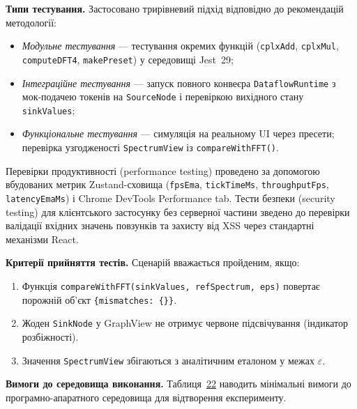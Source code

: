 \textbf{Типи тестування.} Застосовано трирівневий підхід відповідно до
рекомендацій методології:

\begin{itemize}
\item
  \emph{Модульне тестування} --- тестування окремих функцій
  (\texttt{cplxAdd}, \texttt{cplxMul}, \texttt{computeDFT4},
  \texttt{makePreset}) у середовищі Jest~29;
\item
  \emph{Інтеграційне тестування} --- запуск повного конвеєра
  \texttt{DataflowRuntime} з мок-подачею токенів на \texttt{SourceNode}
  і перевіркою вихідного стану \texttt{sinkValues};
\item
  \emph{Функціональне тестування} --- симуляція на реальному UI через
  пресети; перевірка узгодженості \texttt{SpectrumView} із
  \texttt{compareWithFFT()}.
\end{itemize}

Перевірки продуктивності (performance testing) проведено за допомогою
вбудованих метрик Zustand-сховища (\texttt{fpsEma}, \texttt{tickTimeMs},
\texttt{throughputFps}, \texttt{latencyEmaMs}) і Chrome DevTools
Performance tab. Тести безпеки (security testing) для клієнтського
застосунку без серверної частини зведено до перевірки валідації вхідних
значень повзунків та захисту від XSS через стандартні механізми React.

\textbf{Критерії прийняття тестів.} Сценарій вважається пройденим, якщо:

\begin{enumerate}
\def\labelenumi{\arabic{enumi}.}
\item
  Функція \texttt{compareWithFFT(sinkValues,\ refSpectrum,\ eps)}
  повертає порожній об'єкт \texttt{\{mismatches:\ \{\}\}}.
\item
  Жоден \texttt{SinkNode} у GraphView не отримує червоне підсвічування
  (індикатор розбіжності).
\item
  Значення \texttt{SpectrumView} збігаються з аналітичним еталоном у
  межах \(\varepsilon\).
\end{enumerate}

\textbf{Вимоги до середовища виконання.}
Таблиця~\hyperref[tab:requirements]{22} наводить мінімальні вимоги до
програмно-апаратного середовища для відтворення експерименту.

